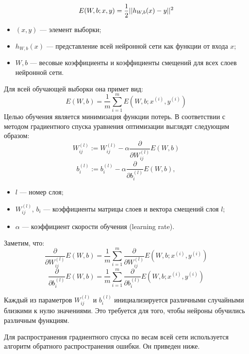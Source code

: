 \documentclass[14pt, a4paper]{extarticle}
\DeclarePairedDelimiter{\norm}{\lvert\lvert}{\rvert\lvert}
\begin{document}
\begin{equation*}
	E(W, b; x, y) = \frac{1}{2} \norm{h_{W,b}(x)-y}^2
\end{equation*}
\begin{itemize}
	\item $(x, y)$ — элемент выборки;
	\item $h_{W,b}(x)$ — представление всей нейронной сети как функции от входа $x$;
	\item $W, b$ — весовые коэффициенты и коэффициенты смещений для всех слоев нейронной сети.
\end{itemize}
Для всей обучающей выборки она примет вид:
\begin{equation*}
	E(W, b) = \frac{1}{m} \sum^{m}_{i=1} E(W, b; x^{(i)}, y^{(i)})
\end{equation*}
Целью обучения является минимизация функции потерь. В соответствии с методом градиентного спуска уравнения оптимизации выглядят следующим образом:
\begin{equation*}
	W^{(l)}_{ij} := W^{(l)}_{ij} - \alpha \frac{\partial}{\partial W^{(l)}_{ij}} E(W, b)
\end{equation*}
\begin{equation*}
	b^{(l)}_i := b^{(l)}_i- \alpha \frac{\partial}{\partial b^{(l)}_i} E(W, b),
\end{equation*}
\begin{itemize}
	\item $l$ — номер слоя;
	\item $W^{(l)}_{ij}$, $b_i$ — коэффициенты матрицы слоев и вектора смещений слоя $l$;
	\item $\alpha$ — коэффициент скорости обучения (learning rate).
\end{itemize}
Заметим, что:
\begin{equation*}
	\frac{\partial}{\partial W^{(l)}_{ij}} E(W, b) = \frac{1}{m} \sum^m_{i=1} \frac{\partial}{\partial W^{(l)}_{ij}} E(W, b; x^{(i)}, y^{(i)})
\end{equation*}
\begin{equation*}
	\frac{\partial}{\partial b^{(l)}_i} E(W, b) = \frac{1}{m} \sum^m_{i=1} \frac{\partial}{\partial b^{(l)}_i} E(W, b; x^{(i)}, y^{(i)})
\end{equation*}

Каждый из параметров $W^{(l)}_{ij}$ и $b^{(l)}_i$ инициализируется различными случайными близкими к нулю значениями. Это требуется для того, чтобы нейроны обучились различным функциям.

Для распространения градиентного спуска по весам всей сети используется алгоритм обратного распространения ошибки. Он приведен ниже.
\end{document}
